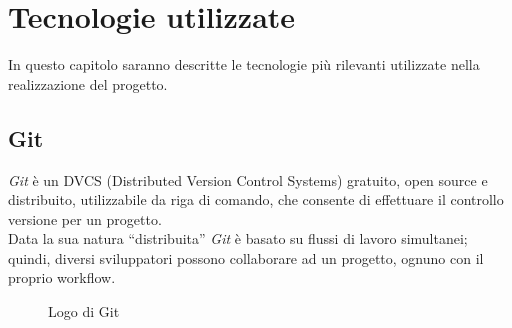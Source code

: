 
\chapter{Tecnologie utilizzate}\label{sec:second_mpi}
In questo capitolo saranno descritte le tecnologie più rilevanti utilizzate nella realizzazione del progetto.

\section{Git}
\emph{Git} è un DVCS (Distributed Version Control Systems) gratuito, open source e distribuito, utilizzabile da riga di comando, che consente di effettuare il controllo versione per un progetto.\\
Data la sua natura “distribuita” \emph{Git} è basato su flussi di lavoro simultanei; quindi, diversi sviluppatori possono collaborare ad un progetto, ognuno con il proprio workflow.
\begin{figure}[ht]
	\centering
	\caption{Logo di Git}
	\label{fig:one}
\end{figure}

